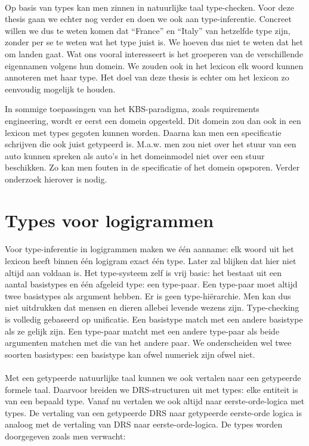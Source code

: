\paragraph{} Op basis van types kan men zinnen in natuurlijke taal type-checken. Voor deze thesis gaan we echter nog verder en doen we ook aan type-inferentie. Concreet willen we dus te weten komen dat ``France'' en ``Italy'' van hetzelfde type zijn, zonder per se te weten wat het type juist is. We hoeven dus niet te weten dat het om landen gaat. Wat ons vooral interesseert is het groeperen van de verschillende eigennamen volgens hun domein. We zouden ook in het lexicon elk woord kunnen annoteren met haar type. Het doel van deze thesis is echter om het lexicon zo eenvoudig mogelijk te houden. 

In sommige toepassingen van het KBS-paradigma, zoals requirements engineering, wordt er eerst een domein opgesteld. Dit domein zou dan ook in een lexicon met types gegoten kunnen worden. Daarna kan men een specificatie schrijven die ook juist getypeerd is. M.a.w. men zou niet over het stuur van een auto kunnen spreken als auto's in het domeinmodel niet over een stuur beschikken. Zo kan men fouten in de specificatie of het domein opsporen. Verder onderzoek hierover is nodig.

\section{Types voor logigrammen}
\paragraph{} Voor type-inferentie in logigrammen maken we één aanname: elk woord uit het lexicon heeft binnen één logigram exact één type. Later zal blijken dat hier niet altijd aan voldaan is. Het type-systeem zelf is vrij basic: het bestaat uit een aantal basistypes en één afgeleid type: een type-paar. Een type-paar moet altijd twee basistypes als argument hebben. Er is geen type-hiërarchie. Men kan dus niet uitdrukken dat mensen en dieren allebei levende wezens zijn. Type-checking is volledig gebaseerd op unificatie. Een basistype match met een andere basistype als ze gelijk zijn. Een type-paar matcht met een andere type-paar als beide argumenten matchen met die van het andere paar. We onderscheiden wel twee soorten basistypes: een basistype kan ofwel numeriek zijn ofwel niet. 


\paragraph{} Met een getypeerde natuurlijke taal kunnen we ook vertalen naar een getypeerde formele taal. Daarvoor breiden we DRS-structuren uit met types: elke entiteit is van een bepaald type. Vanaf nu vertalen we ook altijd naar eerste-orde-logica met types. De vertaling van een getypeerde DRS naar getypeerde eerste-orde logica is analoog met de vertaling van DRS naar eerste-orde-logica. De types worden doorgegeven zoals men verwacht:

